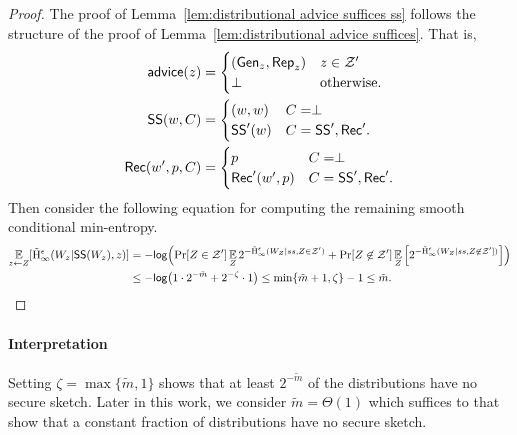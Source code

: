 \begin{proof}
The proof of Lemma~\ref{lem:distributional advice suffices ss} follows the structure of the proof of Lemma~\ref{lem:distributional advice suffices}. That is, 
\begin{align*}
{\ensuremath{\mathsf{advice}}}(z) &= \begin{cases} ({\mathsf{Gen}}_z, {\mathsf{Rep}}_z)& z\in \mathcal{Z}'\\\perp&\text{otherwise.}\end{cases}\\
{\mathsf{SS}}(w, C) &= \begin{cases} (w, w) & C = \perp\\
{\mathsf{SS}}'(w) & C = {\mathsf{SS}}', {\mathsf{Rec}}'.\end{cases}\\
{\mathsf{Rec}}(w', p, C) &= \begin{cases} p & C = \perp\\
{\mathsf{Rec}}'(w',p) & C = {\mathsf{SS}}', {\mathsf{Rec}}'.\end{cases}\\
\end{align*}
Then consider the following equation for computing the remaining smooth conditional min-entropy.
\begin{align*}
\operatorname*{\mathbb{E}}_{z\leftarrow Z} [\tilde{\mathrm{H}}_\infty^\epsilon(W_z| {\mathsf{SS}}(W_z), z)] &= -\mathsf{log}\!\left(\Pr[Z\in \mathcal{Z}']\operatorname*{\mathbb{E}}_{Z} 2^{-\tilde{\mathrm{H}}_\infty^\epsilon(W_Z| ss, Z\in \mathcal{Z}')}+ \Pr[Z\not\in \mathcal{Z}']\operatorname*{\mathbb{E}}_{Z}\left[ 2^{-\tilde{\mathrm{H}}_\infty^\epsilon(W_Z| ss, Z\not\in \mathcal{Z}'] )}\right]\right)\\
&\le -\mathsf{log}\!\left(1 \cdot 2^{-\tilde{m}}+ 2^{-\zeta}\cdot 1\right) \le \min\{\tilde{m}+1,\zeta\}-1\le \tilde{m}.
\end{align*}
\end{proof}

\paragraph{Interpretation}
Setting $\zeta = \max\{\tilde{m},1\} $ shows that at least $2^{-\tilde{m}}$ of the distributions have no secure sketch.  Later in this work, we consider $\tilde{m} = \Theta(1)$ which suffices to that show that a constant fraction of distributions have no secure sketch.



